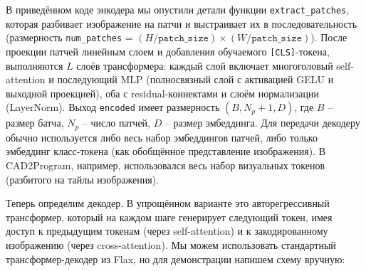 \documentclass{article}
\begin{document}
В приведённом коде энкодера мы опустили детали функции \texttt{extract_patches}, которая разбивает изображение на патчи и выстраивает их в последовательность (размерность \texttt{num_patches} = $(H/\texttt{patch_size})\times(W/\texttt{patch_size})$). После проекции патчей линейным слоем и добавления обучаемого \texttt{[CLS]}-токена, выполняются $L$ слоёв трансформера: каждый слой включает многоголовый self-attention и последующий MLP (полносвязный слой с активацией GELU и выходной проекцией), оба с residual-коннектами и слоём нормализации (LayerNorm). Выход \texttt{encoded} имеет размерность $(B, N_p+1, D)$, где $B$ – размер батча, $N_p$ – число патчей, $D$ – размер эмбеддинга. Для передачи декодеру обычно используется либо весь набор эмбеддингов патчей, либо только эмбеддинг класс-токена (как обобщённое представление изображения). В CAD2Program, например, использовался весь набор визуальных токенов (разбитого на тайлы изображения).

Теперь определим декодер. В упрощённом варианте это авторегрессивный трансформер, который на каждом шаге генерирует следующий токен, имея доступ к предыдущим токенам (через self-attention) и к закодированному изображению (через cross-attention). Мы можем использовать стандартный трансформер-декодер из Flax, но для демонстрации напишем схему вручную:
\end{document}
